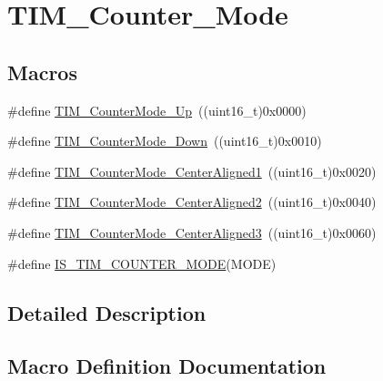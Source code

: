 \hypertarget{group___t_i_m___counter___mode}{}\section{T\+I\+M\+\_\+\+Counter\+\_\+\+Mode}
\label{group___t_i_m___counter___mode}
\subsection*{Macros}
\begin{DoxyCompactItemize}
\item 
\#define \mbox{\hyperlink{group___t_i_m___counter___mode_gaf4cd3ce74af3122507b77c8f6e79c832}{T\+I\+M\+\_\+\+Counter\+Mode\+\_\+\+Up}}~((uint16\+\_\+t)0x0000)
\item 
\#define \mbox{\hyperlink{group___t_i_m___counter___mode_gadd7c4200d185bdcd9e64ae80e6b200b0}{T\+I\+M\+\_\+\+Counter\+Mode\+\_\+\+Down}}~((uint16\+\_\+t)0x0010)
\item 
\#define \mbox{\hyperlink{group___t_i_m___counter___mode_gac07392e9637f8a0d115d4ba9a002ae93}{T\+I\+M\+\_\+\+Counter\+Mode\+\_\+\+Center\+Aligned1}}~((uint16\+\_\+t)0x0020)
\item 
\#define \mbox{\hyperlink{group___t_i_m___counter___mode_ga3793122e4c123a99e46fc2f04acea0d4}{T\+I\+M\+\_\+\+Counter\+Mode\+\_\+\+Center\+Aligned2}}~((uint16\+\_\+t)0x0040)
\item 
\#define \mbox{\hyperlink{group___t_i_m___counter___mode_ga65d9bc01ffa287cd7cf200d08c20a1ce}{T\+I\+M\+\_\+\+Counter\+Mode\+\_\+\+Center\+Aligned3}}~((uint16\+\_\+t)0x0060)
\item 
\#define \mbox{\hyperlink{group___t_i_m___counter___mode_ga9543fec190793e800d5d1b1b853636f5}{I\+S\+\_\+\+T\+I\+M\+\_\+\+C\+O\+U\+N\+T\+E\+R\+\_\+\+M\+O\+DE}}(M\+O\+DE)
\end{DoxyCompactItemize}


\subsection{Detailed Description}


\subsection{Macro Definition Documentation}
\mbox{\label{group___t_i_m___counter___mode_ga9543fec190793e800d5d1b1b853636f5}} 
